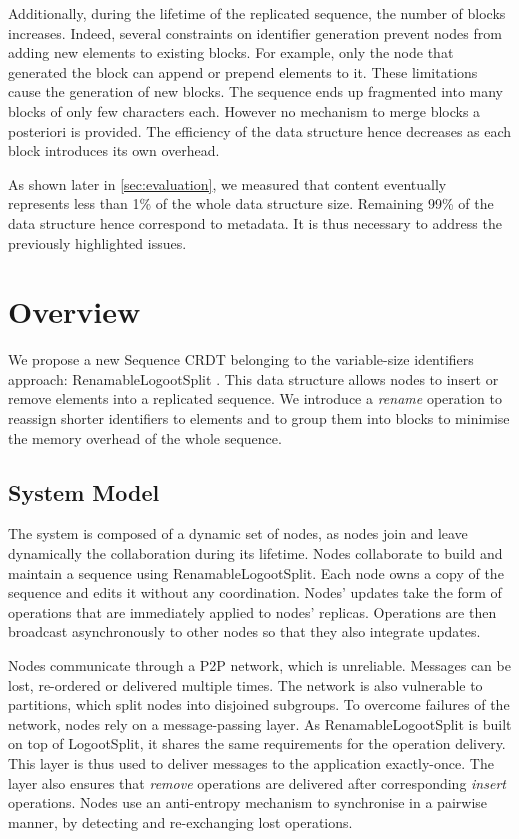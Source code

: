\documentclass[10pt,journal,compsoc]{IEEEtran}
\begin{document}
Additionally, during the lifetime of the replicated sequence, the number of blocks increases.
Indeed, several constraints on identifier generation prevent nodes from adding new elements to existing blocks.
For example, only the node that generated the block can append or prepend elements to it.
These limitations cause the generation of new blocks.
The sequence ends up fragmented into many blocks of only few characters each.
However no mechanism to merge blocks a posteriori is provided.
The efficiency of the data structure hence decreases as each block introduces its own overhead.

As shown later in \autoref{sec:evaluation}, we measured that content eventually represents less than 1\% of the whole data structure size.
Remaining 99\% of the data structure hence correspond to metadata.
It is thus necessary to address the previously highlighted issues.

\section{Overview}
\label{sec:overview}

We propose a new Sequence \ac{CRDT} belonging to the variable-size identifiers approach: RenamableLogootSplit \cite{nicolas:hal-01932552,nicolas:hal-02526724}.
This data structure allows nodes to insert or remove elements into a replicated sequence.
We introduce a \emph{rename} operation to reassign shorter identifiers to elements and to group them into blocks to minimise the memory overhead of the whole sequence.

\subsection{System Model}

The system is composed of a dynamic set of nodes, as nodes join and leave dynamically the collaboration during its lifetime.
Nodes collaborate to build and maintain a sequence using RenamableLogootSplit.
Each node owns a copy of the sequence and edits it without any coordination.
Nodes' updates take the form of operations that are immediately applied to nodes' replicas.
Operations are then broadcast asynchronously to other nodes so that they also integrate updates.

Nodes communicate through a \ac{P2P} network, which is unreliable.
Messages can be lost, re-ordered or delivered multiple times.
The network is also vulnerable to partitions, which split nodes into disjoined subgroups.
To overcome failures of the network, nodes rely on a message-passing layer.
As RenamableLogootSplit is built on top of LogootSplit, it shares the same requirements for the operation delivery.
This layer is thus used to deliver messages to the application exactly-once.
The layer also ensures that \emph{remove} operations are delivered after corresponding \emph{insert} operations.
Nodes use an anti-entropy mechanism \cite{10.1109/TSE.1983.236733} to synchronise in a pairwise manner, by detecting and re-exchanging lost operations.
\end{document}
